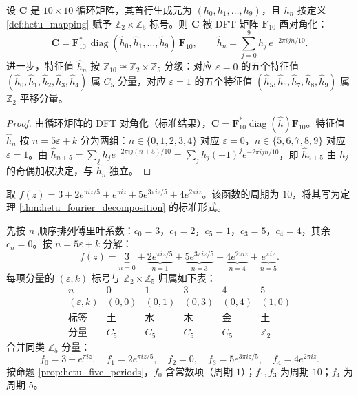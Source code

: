 \begin{theorem}\label{thm:hetu_circulant}
设 $\mathbf{C}$ 是 $10 \times 10$ 循环矩阵，其首行生成元为 $(h_0, h_1, \dots, h_9)$，且 $h_n$ 按定义 \ref{def:hetu_mapping} 赋予 $\mathbb{Z}_2 \times \mathbb{Z}_5$ 标号。则 $\mathbf{C}$ 被 DFT 矩阵 $\mathbf{F}_{10}$ 酉对角化：
\[
\mathbf{C} = \mathbf{F}_{10}^*\, \operatorname{diag}(\hat{h}_0, \hat{h}_1, \dots, \hat{h}_9)\, \mathbf{F}_{10}, \qquad
\hat{h}_n = \sum_{j=0}^{9} h_j\, e^{-2\pi i j n / 10}.
\]
进一步，特征值 $\hat{h}_n$ 按 $\mathbb{Z}_{10} \cong \mathbb{Z}_2 \times \mathbb{Z}_5$ 分级：对应 $\varepsilon = 0$ 的五个特征值 $(\hat{h}_0, \hat{h}_1, \hat{h}_2, \hat{h}_3, \hat{h}_4)$ 属 $C_5$ 分量，对应 $\varepsilon = 1$ 的五个特征值 $(\hat{h}_5, \hat{h}_6, \hat{h}_7, \hat{h}_8, \hat{h}_9)$ 属 $\mathbb{Z}_2$ 平移分量。
\end{theorem}

\begin{proof}
由循环矩阵的 DFT 对角化（标准结果），$\mathbf{C} = \mathbf{F}_{10}^* \operatorname{diag}(\hat{h}) \mathbf{F}_{10}$。特征值 $\hat{h}_n$ 按 $n = 5\varepsilon + k$ 分为两组：$n \in \{0,1,2,3,4\}$ 对应 $\varepsilon = 0$，$n \in \{5,6,7,8,9\}$ 对应 $\varepsilon = 1$。由 $\hat{h}_{n+5} = \sum_j h_j e^{-2\pi i j (n+5)/10} = \sum_j h_j (-1)^j e^{-2\pi i j n/10}$，即 $\hat{h}_{n+5}$ 由 $h_j$ 的奇偶加权决定，与 $\hat{h}_n$ 独立。
\end{proof}

\begin{example}[河图复变函数的具体分解]\label{ex:hetu_concrete}
取 $f(z) = 3 + 2 e^{\pi i z / 5} + e^{\pi i z} + 5 e^{3\pi i z / 5} + 4 e^{2\pi i z}$。该函数的周期为 $10$，将其写为定理 \ref{thm:hetu_fourier_decomposition} 的标准形式。

先按 $n$ 顺序排列傅里叶系数：$c_0 = 3$，$c_1 = 2$，$c_5 = 1$，$c_3 = 5$，$c_4 = 4$，其余 $c_n = 0$。按 $n = 5\varepsilon + k$ 分解：
\[
f(z) = \underbrace{3}_{n=0} + \underbrace{2 e^{\pi i z / 5}}_{n=1} + \underbrace{5 e^{3\pi i z / 5}}_{n=3} + \underbrace{4 e^{2\pi i z}}_{n=4} + \underbrace{e^{\pi i z}}_{n=5}.
\]
每项分量的 $(\varepsilon, k)$ 标号与 $\mathbb{Z}_2 \times \mathbb{Z}_5$ 归属如下表：
\[
\begin{array}{c|ccccc}
n & 0 & 1 & 3 & 4 & 5 \\
\hline
(\varepsilon, k) & (0, 0) & (0, 1) & (0, 3) & (0, 4) & (1, 0) \\
\text{标签} & \text{土} & \text{水} & \text{木} & \text{金} & \text{土} \\
\text{分量} & C_5 & C_5 & C_5 & C_5 & \mathbb{Z}_2
\end{array}
\]
合并同类 $\mathbb{Z}_5$ 分量：
\[
f_0 = 3 + e^{\pi i z}, \quad f_1 = 2 e^{\pi i z/5}, \quad f_2 = 0, \quad f_3 = 5 e^{3\pi i z/5}, \quad f_4 = 4 e^{2\pi i z}.
\]
按命题 \ref{prop:hetu_five_periods}，$f_0$ 含常数项（周期 $1$）；$f_1, f_3$ 为周期 $10$；$f_4$ 为周期 $5$。
\end{example}

